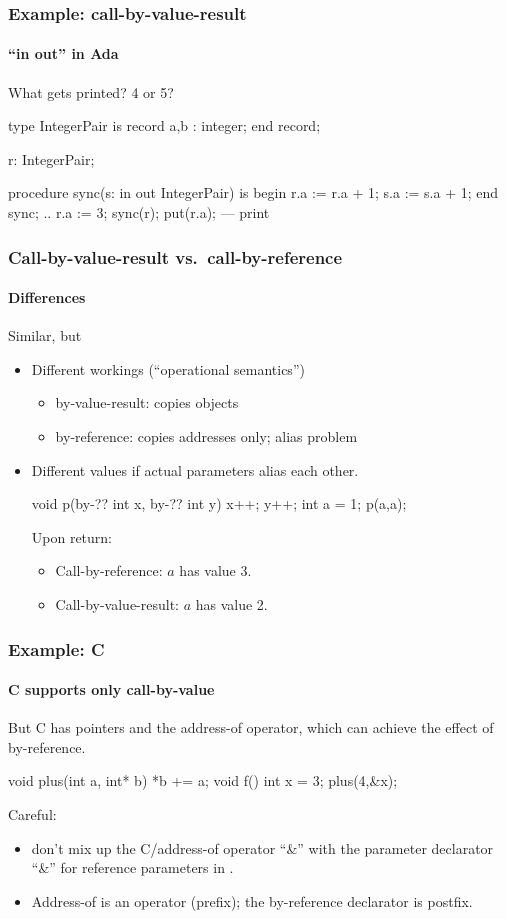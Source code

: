 \documentclass{beamer}
\begin{document}
\begin{frame}[fragile]
\frametitle{Example: call-by-value-result}
\framesubtitle{``in out'' in Ada}

What gets printed? 4 or 5? 
\begin{cplus}
type IntegerPair is 
record
   a,b : integer;
end record;

r: IntegerPair; 

procedure sync(s: in out IntegerPair) is
begin
   r.a := r.a + 1;
   s.a := s.a + 1;
end sync;
..
r.a := 3;
sync(r);
put(r.a); --- print 

\end{cplus}
\end{frame}





\begin{frame}[fragile]
\frametitle{Call-by-value-result vs.\ call-by-reference}
\framesubtitle{Differences}
Similar, but
\begin{itemize}
\item Different workings  (``operational semantics'')
\begin{itemize}
\item by-value-result: copies objects
\item by-reference: copies addresses only; alias problem
\end{itemize}
\item Different values if actual parameters alias each other.
\begin{cplus}
void p(by-?? int x, by-?? int y) { 
   x++; 
   y++; 
}
int a = 1;
p(a,a);
\end{cplus}
Upon return: 
\begin{itemize}
\item 
Call-by-reference: $a$ has value  3. 
\item 
Call-by-value-result: $a$ has value 2.
\end{itemize}
\end{itemize}
\end{frame}





\begin{frame}[fragile]
\frametitle{Example: C}
\framesubtitle{C supports only call-by-value}
But C has pointers and the address-of operator, which can
achieve the effect of by-reference.


\begin{cplus3}
void plus(int a, int* b) { *b += a;}
void f() {
   int x = 3;
   plus(4,&x);
}
\end{cplus3}
Careful:
\begin{itemize}
\item don't mix  up the C/\cpp address-of operator ``\&'' with
the parameter declarator ``\&'' for reference parameters in \cpp.
\item Address-of is an operator (prefix); the by-reference declarator is postfix.
\end{itemize}
\end{frame}
\end{document}
